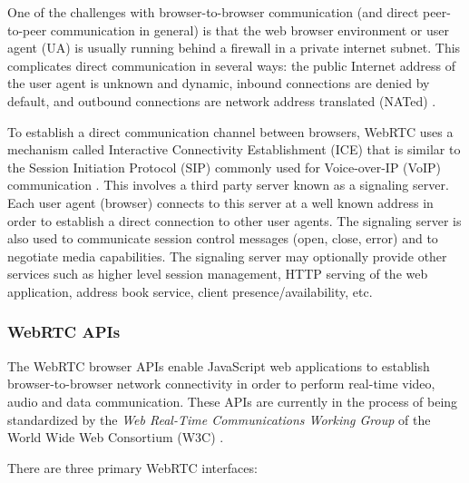 \documentclass[conference,compsoc]{./IEEEtran/IEEEtran}
\begin{document}
One of the challenges with browser-to-browser communication (and
direct peer-to-peer communication in general) is that the web browser
environment or user agent (UA) is usually running behind a firewall in
a private internet subnet. This complicates direct communication in
several ways: the public Internet address of the user agent is unknown
and dynamic, inbound connections are denied by default, and outbound
connections are network address translated (NATed)
\cite[Section~3.4]{draft-rtcweb-transports}.

To establish a direct communication channel between browsers, WebRTC
uses a mechanism called Interactive Connectivity Establishment (ICE)
that is similar to the Session Initiation Protocol (SIP) commonly used
for Voice-over-IP (VoIP) communication \cite{RFC5245:ice}. This
involves a third party server known as a signaling server. Each user
agent (browser) connects to this server at a well known address in
order to establish a direct connection to other user agents. The
signaling server is also used to communicate session control messages
(open, close, error) and to negotiate media capabilities. %
The signaling server may optionally provide other services such as
higher level session management, HTTP serving of the web application,
address book service, client presence/availability, etc. %

\subsubsection{WebRTC APIs}

The WebRTC browser APIs enable JavaScript web applications
to establish browser-to-browser network connectivity in order to
perform real-time video, audio and data communication. These APIs are
currently in the process of being standardized by the \emph{Web
Real-Time Communications Working Group} of the World Wide Web
Consortium (W3C) \cite{webrtc:wg}.

There are three primary WebRTC interfaces:
\end{document}
